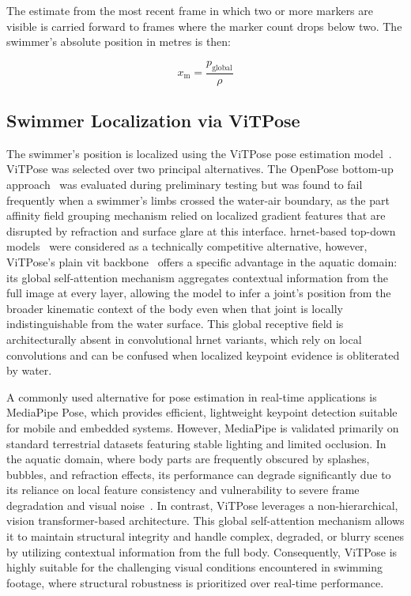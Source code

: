 The estimate from the most recent frame in which two or more markers are visible is carried
forward to frames where the marker count drops below two. The swimmer's absolute position in
metres is then:

\begin{equation}
    x_{\text{m}} = \frac{p_{\text{global}}}{\rho}
\end{equation}

\subsection{Swimmer Localization via ViTPose}

The swimmer's position is localized using the ViTPose pose estimation model~\cite{xu2022vitpose}.
ViTPose was selected over two principal alternatives. The OpenPose bottom-up approach~\cite{cao2019openpose}
was evaluated during preliminary testing but was found to fail frequently when a swimmer's
limbs crossed the water-air boundary, as the part affinity field grouping mechanism relied on
localized gradient features that are disrupted by refraction and surface glare at this
interface. \gls{hrnet}-based top-down models~\cite{wang2020deep} were considered as a technically
competitive alternative, however, ViTPose's plain \gls{vit} backbone~\cite{dosovitskiy2020image}
offers a specific advantage in the aquatic domain: its global self-attention mechanism
aggregates contextual information from the full image at every layer, allowing the model to
infer a joint's position from the broader kinematic context of the body even when that joint
is locally indistinguishable from the water surface. This global receptive field is
architecturally absent in convolutional \gls{hrnet} variants, which rely on local convolutions and
can be confused when localized keypoint evidence is obliterated by water.

A commonly used alternative for pose estimation in real-time applications is MediaPipe Pose, which provides efficient, lightweight keypoint detection suitable for mobile and embedded systems. However, MediaPipe is validated primarily on standard terrestrial datasets featuring stable lighting and limited occlusion. In the aquatic domain, where body parts are frequently obscured by splashes, bubbles, and refraction effects, its performance can degrade significantly due to its reliance on local feature consistency and vulnerability to severe frame degradation and visual noise~\cite{elshami2025visual}. In contrast, ViTPose leverages a non-hierarchical, vision transformer-based architecture. This global self-attention mechanism allows it to maintain structural integrity and handle complex, degraded, or blurry scenes by utilizing contextual information from the full body. Consequently, ViTPose is highly suitable for the challenging visual conditions encountered in swimming footage, where structural robustness is prioritized over real-time performance.

